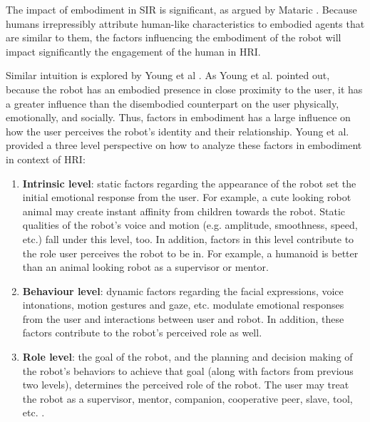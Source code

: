 The impact of embodiment in SIR is significant, as argued by Mataric \cite{mataric2005role}.  Because humans irrepressibly attribute human-like characteristics to embodied agents that are similar to them, the factors influencing the embodiment of the robot will impact significantly the engagement of the human in HRI.


Similar intuition is explored by Young et al \cite{young2011evaluating}.  As Young et al. pointed out, because the robot has an embodied presence in close proximity to the user, it has a greater influence than the disembodied counterpart on the user physically, emotionally, and socially. Thus, factors in embodiment has a large influence on how the user perceives the robot's identity and their relationship.  Young et al. provided a three level perspective on how to analyze these factors in embodiment in context of HRI:
\begin{enumerate}
	\item \textbf{Intrinsic level}: static factors regarding the appearance of the robot set the initial emotional response from the user.  For example, a cute looking robot animal may create instant affinity from children towards the robot.  Static qualities of the robot's voice and motion (e.g. amplitude, smoothness, speed, etc.) fall under this level, too.  In addition, factors in this level contribute to the role user perceives the robot to be in.  For example, a humanoid is better than an animal looking robot as a supervisor or mentor.
	
	\item \textbf{Behaviour level}: dynamic factors regarding the facial expressions, voice intonations, motion gestures and gaze, etc. modulate emotional responses from the user and interactions between user and robot.  In addition, these factors contribute to the robot's perceived role as well.
	
	\item \textbf{Role level}: the goal of the robot, and the planning and decision making of the robot's behaviors to achieve that goal (along with factors from previous two levels), determines the perceived role of the robot.  The user may treat the robot as a supervisor, mentor, companion, cooperative peer, slave, tool, etc. \cite{goodrich2007human}.
\end{enumerate}


